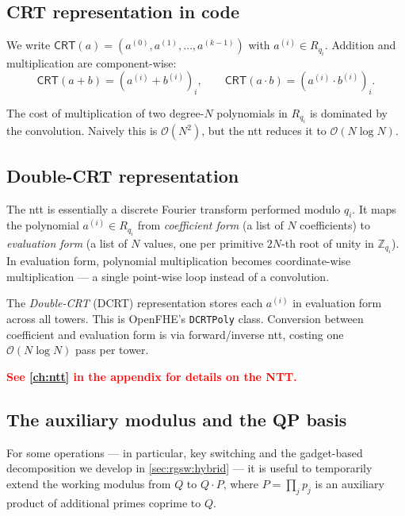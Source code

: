 \subsection{CRT representation in code}
\label{sec:rns:crt-rep}

We write $\mathsf{CRT}(a) = (a^{(0)}, a^{(1)}, \dots, a^{(k-1)})$ with $a^{(i)} \in R_{q_i}$. Addition and multiplication are component-wise:
\begin{equation}
    \mathsf{CRT}(a + b) = (a^{(i)} + b^{(i)})_i, \qquad \mathsf{CRT}(a \cdot b) = (a^{(i)} \cdot b^{(i)})_i.
\end{equation}

The cost of multiplication of two degree-$N$ polynomials in $R_{q_i}$ is dominated by the convolution. Naively this is $\mathcal{O}(N^2)$, but the \gls{ntt} reduces it to $\mathcal{O}(N \log N)$.

\subsection{Double-CRT representation}
\label{sec:rns:dcrt}

The \gls{ntt} is essentially a discrete Fourier transform performed modulo $q_i$. It maps the polynomial $a^{(i)} \in R_{q_i}$ from \emph{coefficient form} (a list of $N$ coefficients) to \emph{evaluation form} (a list of $N$ values, one per primitive $2N$-th root of unity in $\mathbb{Z}_{q_i}$). In evaluation form, polynomial multiplication becomes coordinate-wise multiplication --- a single point-wise loop instead of a convolution.

The \emph{Double-CRT} (DCRT) representation stores each $a^{(i)}$ in evaluation form across all towers. This is OpenFHE's \texttt{DCRTPoly} class. Conversion between coefficient and evaluation form is via forward/inverse \gls{ntt}, costing one $\mathcal{O}(N \log N)$ pass per tower.

\noindent\textcolor{red}{\textbf{See \autoref{ch:ntt} in the appendix for details on the NTT.}}

\subsection{The auxiliary modulus and the QP basis}
\label{sec:rns:qp}

For some operations --- in particular, key switching and the gadget-based decomposition we develop in \autoref{sec:rgsw:hybrid} --- it is useful to temporarily extend the working modulus from $Q$ to $Q \cdot P$, where $P = \prod_{j} p_j$ is an auxiliary product of additional primes coprime to $Q$.

